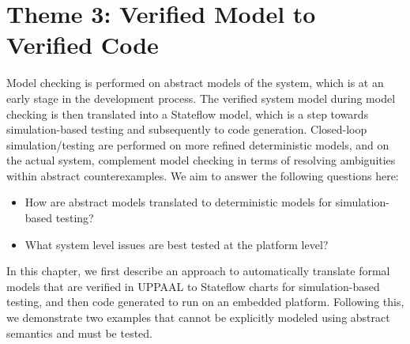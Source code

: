 \chapter{Theme 3: Verified Model to Verified Code}
Model checking is performed on abstract models of the system, which is at an early stage in the development process. The verified system model during model checking is then translated into a Stateflow model, which is a step towards simulation-based testing and subsequently to code generation. Closed-loop simulation/testing are performed on more refined deterministic models, and on the actual system, complement model checking in terms of resolving ambiguities within abstract counterexamples. We aim to answer the following questions here:

\begin{itemize}
	\vspace{-5pt}
	\item How are abstract models translated to deterministic models for simulation-based testing?
	\vspace{-5pt}
	\item What system level issues are best tested at the platform level?
\end{itemize}

In this chapter, we first describe an approach to automatically translate formal models that are verified in UPPAAL to Stateflow charts for simulation-based testing, and then code generated to run on an embedded platform. Following this, we demonstrate two examples that cannot be explicitly modeled using abstract semantics and must be tested.

